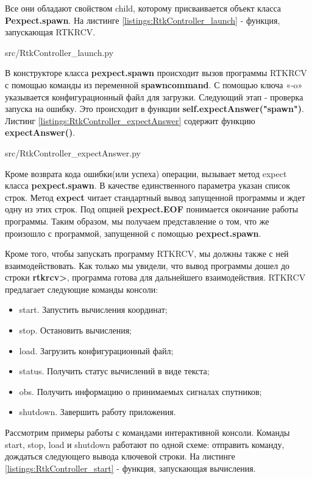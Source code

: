Все они обладают свойством child, которому присваивается объект класса \textbf{Pexpect.spawn}. На листинге \ref{listings:RtkController_launch} - функция, запускающая RTKRCV.


{src/RtkController_launch.py}

В конструкторе класса \textbf{pexpect.spawn} происходит вызов программы RTKRCV с помощью команды из переменной \textbf{spawn\textunderscore command}. С помощью ключа «-o» указывается конфигурационный файл для загрузки. Следующий этап - проверка запуска на ошибку. Это происходит в функции \textbf{self.expectAnswer("spawn")}. Листинг \ref{listings:RtkController_expectAnswer} содержит функцию \textbf{expectAnswer()}.


{src/RtkController_expectAnswer.py}

Кроме возврата кода ошибки(или успеха) операции, вызывает метод expect класса \textbf{pexpect.spawn}. В качестве единственного параметра указан список строк. Метод \textbf{expect} читает стандартный вывод запущенной программы и ждет одну из этих строк. Под опцией \textbf{pexpect.EOF} понимается окончание работы программы. Таким образом, мы получаем представление о том, что же произошло с программой, запущенной с помощью \textbf{pexpect.spawn}.

Кроме того, чтобы запускать программу RTKRCV, мы должны также с ней взаимодействовать. Как только мы увидели, что вывод программы дошел до строки \textbf{rtkrcv>}, программа готова для дальнейшего взаимодействия. RTKRCV предлагает следующие команды консоли:

\begin{itemize}
  \item start. Запустить вычисления координат;
  \item stop. Остановить вычисления;
  \item load. Загрузить конфигурационный файл;
  \item status. Получить статус вычислений в виде текста;
  \item obs. Получить информацию о принимаемых сигналах спутников;
  \item shutdown. Завершить работу приложения.
\end{itemize}

Рассмотрим примеры работы с командами интерактивной консоли. Команды start, stop, load и shutdown работают по одной схеме: отправить команду, дождаться следующего вывода ключевой строки. На листинге \ref{listings:RtkController_start} - функция, запускающая вычисления.

